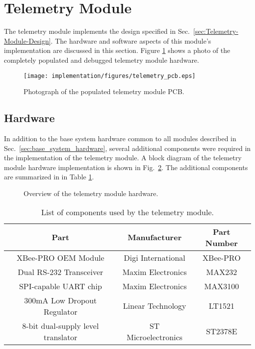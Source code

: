 \section{Telemetry Module}

The telemetry module implements the design specified in Sec.\ \ref{sec:Telemetry-Module-Design}. The hardware and software aspects of this module's implementation are discussed in this section. Figure \ref{fig:telemetry_pcb} shows a photo of the completely populated and debugged telemetry module hardware.

\begin{figure}[H]
\centering
\texttt{[image: implementation/figures/telemetry\_pcb.eps]}
\caption{Photograph of the populated telemetry module PCB.}
\label{fig:telemetry_pcb}
\end{figure}

\subsection{Hardware}

In addition to the base system hardware common to all modules described in Sec.\ \ref{sec:base_system_hardware}, several additional components were required in the implementation of the telemetry module. A block diagram of the telemetry module hardware implementation is shown in Fig.\ \ref{fig:telemetry_hardware_block}. The additional components are summarized in in Table \ref{tab:telemetry_module_components}.

\begin{figure}[H]
\centering

\caption{Overview of the telemetry module hardware.\label{fig:telemetry_hardware_block}}
\end{figure}

\begin{table}[H]
  \caption{List of components used by the telemetry module.}
  \centering
    \begin{tabular}{|c|c|c|}
      \hline 
      Part & Manufacturer & Part Number\tabularnewline
      \hline
      \hline
      XBee-PRO OEM Module & Digi International & XBee-PRO\tabularnewline
      \hline 
      Dual RS-232 Transceiver & Maxim Electronics & MAX232\tabularnewline
      \hline 
      SPI-capable UART chip & Maxim Electronics & MAX3100\tabularnewline
      \hline 
      300mA Low Dropout Regulator & Linear Technology & LT1521\tabularnewline
      \hline
      8-bit dual-supply level translator & ST Microelectronics & ST2378E\tabularnewline
      \hline
    \end{tabular}
    \label{tab:telemetry_module_components}
\end{table}

